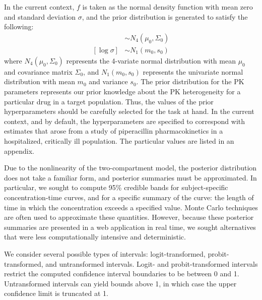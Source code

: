 \documentclass{article}\usepackage[]{graphicx}\usepackage[]{color}
\begin{document}
In the current context, $f$ is taken as the normal density function with mean zero and standard deviation $\sigma$, and the prior distribution is generated to satisfy the following:
\begin{align}
[\log \theta_i] &\sim N_4(\mu_0, \Sigma_0) \\
[\log \sigma] &\sim N_1(m_0, s_0)
\end{align}
\noindent where $N_4(\mu_0, \Sigma_0)$ represents the 4-variate normal distribution with mean $\mu_0$ and covariance matrix $\Sigma_0$, and $N_1(m_0, s_0)$ represents the univariate normal distribution with mean $m_0$ and variance $s_0$. The prior distribution for the PK parameters represents our prior knowledge about the PK heterogeneity for a particular drug in a target population. Thus, the values of the prior hyperparameters should be carefully selected for the task at hand. In the current context, and by default, the hyperparameters are specified to correspond with estimates that arose from a study of piperacillin pharmacokinetics in a hospitalized, critically ill population. The particular values are listed in an appendix.

Due to the nonlinearity of the two-compartment model, the posterior distribution does not take a familiar form, and posterior summaries must be approximated. In particular, we sought to compute 95\% credible bands for subject-specific concentration-time curves, and for a specific summary of the curve: the length of time in which the concentration exceeds a specified value. Monte Carlo techniques are often used to approximate these quantities. However, because these posterior summaries are presented in a web application in real time, we sought alternatives that were less computationally intensive and deterministic.

We consider several possible types of intervals: logit-transformed, probit-transformed, and untransformed intervals. Logit- and probit-transformed intervals restrict the computed confidence interval boundaries to be between 0 and 1. Untransformed intervals can yield bounds above 1, in which case the upper confidence limit is truncated at 1.

\end{document}
